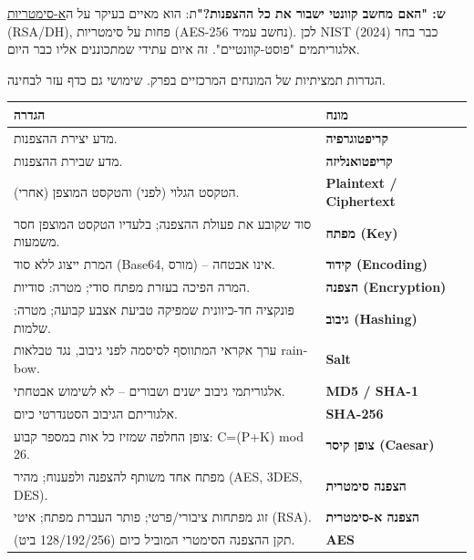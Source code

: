 \documentclass[11pt]{article}
\newcommand{\enLR}[1]{\textenglish{#1}}
\newcommand{\sectionheading}[1]{\vskip10pt\penalty-200{\large\bfseries\color{h2}#1\par}\vskip3pt}
\begin{document}
\textbf{ש: "האם מחשב קוונטי ישבור את כל ההצפנות?"}\newline ת: הוא מאיים בעיקר על ה\underline{א-סימטריות} \enLR{(RSA/DH)}, פחות על סימטריות \enLR{(AES-256} נחשב עמיד). לכן \enLR{NIST} כבר בחר \enLR{(2024)} אלגוריתמים "פוסט-קוונטיים". זה איום עתידי שמתכוננים אליו כבר היום.\par

\sectionheading{מילון מונחים – הגדרות}

הגדרות תמציתיות של המונחים המרכזיים בפרק. שימושי גם כדף עזר לבחינה.\par

\begin{xltabular}{\linewidth}{|>{\setRTL\raggedleft\arraybackslash}X|>{\setRTL\raggedleft\arraybackslash}X|}
\hline
{}\textbf{הגדרה} & \textbf{מונח} \\
\hline
\endhead
מדע יצירת ההצפנות. & \textbf{קריפטוגרפיה} \\
\hline
מדע שבירת ההצפנות. & \textbf{קריפטואנליזה} \\
\hline
הטקסט הגלוי (לפני) והטקסט המוצפן (אחרי). & \textbf{\enLR{Plaintext / Ciphertext}} \\
\hline
סוד שקובע את פעולת ההצפנה; בלעדיו הטקסט המוצפן חסר משמעות. & \textbf{מפתח \enLR{(Key)}} \\
\hline
המרת ייצוג ללא סוד \enLR{(Base64}, מורס) – אינו אבטחה. & \textbf{קידוד \enLR{(Encoding)}} \\
\hline
המרה הפיכה בעזרת מפתח סודי; מטרה: סודיות. & \textbf{הצפנה \enLR{(Encryption)}} \\
\hline
פונקציה חד-כיוונית שמפיקה טביעת אצבע קבועה; מטרה: שלמות. & \textbf{גיבוב \enLR{(Hashing)}} \\
\hline
ערך אקראי המתווסף לסיסמה לפני גיבוב, נגד טבלאות \enLR{rainbow.} & \textbf{\enLR{Salt}} \\
\hline
אלגוריתמי גיבוב ישנים ושבורים – לא לשימוש אבטחתי. & \textbf{\enLR{MD5 / SHA-1}} \\
\hline
אלגוריתם הגיבוב הסטנדרטי כיום. & \textbf{\enLR{SHA-256}} \\
\hline
צופן החלפה שמזיז כל אות במספר קבוע: \enLR{C=(P+K) mod 26.} & \textbf{צופן קיסר \enLR{(Caesar)}} \\
\hline
מפתח אחד משותף להצפנה ולפענוח; מהיר \enLR{(AES, 3DES, DES).} & \textbf{הצפנה סימטרית} \\
\hline
זוג מפתחות ציבורי/פרטי; פותר העברת מפתח; איטי \enLR{(RSA).} & \textbf{הצפנה א-סימטרית} \\
\hline
תקן ההצפנה הסימטרי המוביל כיום \enLR{(128/192/256} ביט). & \textbf{\enLR{AES}} \\

\end{xltabular}
\end{document}
